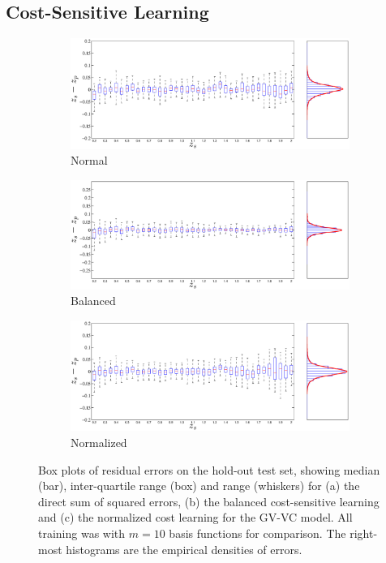 \documentclass[useAMS,usenatbib,fleqn]{mn2e}
\begin{document}
\subsection{Cost-Sensitive Learning}


\begin{figure}
        \centering
        \begin{subfigure}[b]{\columnwidth}
                \includegraphics[width=\textwidth]{figures/Zspec-Zphot_normal.eps}
                \caption{Normal}
                \label{fig-normal}
        \end{subfigure}	
        \begin{subfigure}[b]{\columnwidth}
                \includegraphics[width=\textwidth]{figures/Zspec-Zphot_balanced.eps}
                \caption{Balanced}
                \label{fig-balanced}
        \end{subfigure}
       \begin{subfigure}[b]{\columnwidth}
                \includegraphics[width=\textwidth]{figures/Zspec-Zphot_normalised.eps}
                \caption{Normalized}
                \label{fig-normalized}
        \end{subfigure}
       \caption{Box plots of residual errors on the hold-out test set, showing median (bar), inter-quartile range (box) and range (whiskers) for (a) the direct sum of squared errors, (b) the balanced cost-sensitive learning and (c) the normalized cost learning for the GV-VC model. All training was with $m=10$ basis functions for comparison. The right-most histograms are the empirical densities of errors.}
	\label{fig-normal-balanced}
\end{figure}
\end{document}
